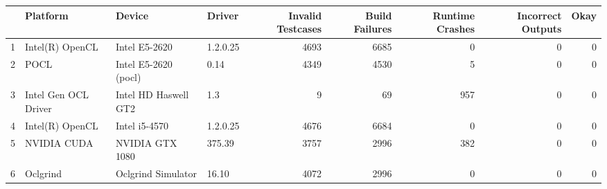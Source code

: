 \begin{tabular}{llllrrrrr}
\toprule
{} &              Platform &                Device &    Driver &  Invalid Testcases &  Build Failures &  Runtime Crashes &  Incorrect Outputs &  Okay \\
\midrule
1 &       Intel(R) OpenCL &         Intel E5-2620 &  1.2.0.25 &               4693 &            6685 &                0 &                  0 &     0 \\
2 &                  POCL &  Intel E5-2620 (pocl) &      0.14 &               4349 &            4530 &                5 &                  0 &     0 \\
3 &  Intel Gen OCL Driver &  Intel HD Haswell GT2 &       1.3 &                  9 &              69 &              957 &                  0 &     0 \\
4 &       Intel(R) OpenCL &         Intel i5-4570 &  1.2.0.25 &               4676 &            6684 &                0 &                  0 &     0 \\
5 &           NVIDIA CUDA &       NVIDIA GTX 1080 &    375.39 &               3757 &            2996 &              382 &                  0 &     0 \\
6 &              Oclgrind &    Oclgrind Simulator &     16.10 &               4072 &            2996 &                0 &                  0 &     0 \\
\bottomrule
\end{tabular}
